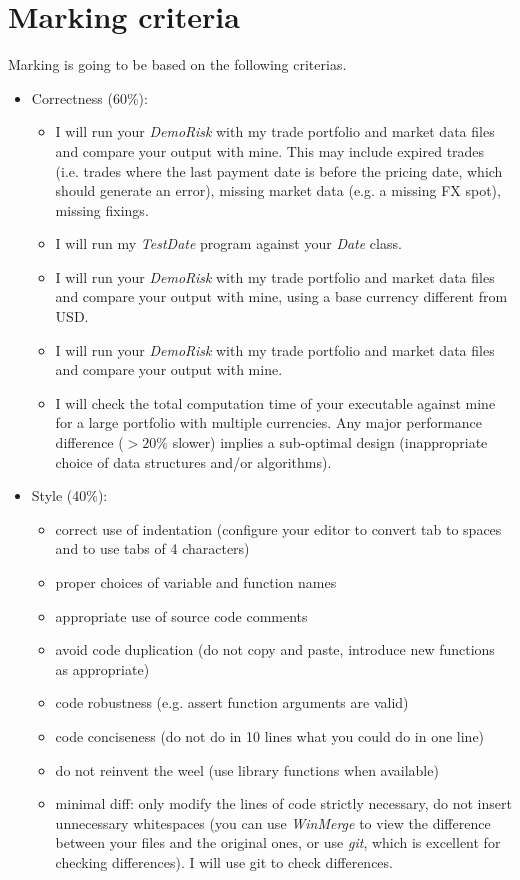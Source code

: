 \documentclass[10pt]{article}
\begin{document}
\section{Marking criteria}
Marking is going to be based on the following criterias.
\begin{itemize}
\item Correctness (60\%):
\begin{itemize}
\item I will run your \textit{DemoRisk} with my trade portfolio and market data files and compare your output with mine. This may include expired trades (i.e. trades where the last payment date is before the pricing date, which should generate an error), missing market data (e.g. a missing FX spot), missing fixings.
\item I will run my \textit{TestDate} program against your \textit{Date} class.
\item I will run your \textit{DemoRisk} with my trade portfolio and market data files and compare your output with mine, using a base currency different from USD.
\item I will run your \textit{DemoRisk} with my trade portfolio and market data files and compare your output with mine.
\item I will check the total computation time of your executable against mine for a large portfolio with multiple currencies.
Any major performance difference ($>20\%$ slower) implies a sub-optimal design (inappropriate choice of data structures and/or algorithms).
\end{itemize}
\item Style (40\%):
\begin{itemize}
\item correct use of indentation (configure your editor to convert tab to spaces and to use tabs of 4 characters)
\item proper choices of variable and function names
\item appropriate use of source code comments
\item avoid code duplication (do not copy and paste, introduce new functions as appropriate)
\item code robustness (e.g. assert function arguments are valid)
\item code conciseness (do not do in 10 lines what you could do in one line)
\item do not reinvent the weel (use library functions when available)
\item minimal diff: only modify the lines of code strictly necessary, do not insert unnecessary whitespaces (you can use \textit{WinMerge} to view the difference between your files and the original ones, or use \textit{git}, which is excellent for checking differences). I will use git to check differences.
\end{itemize}
\end{itemize}
\end{document}
